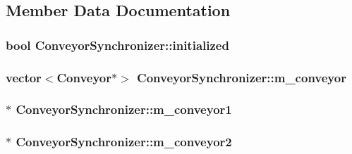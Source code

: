 \subsection{Member Data Documentation}
\hypertarget{classConveyorSynchronizer_aff3ac2926f3771d47d4954cc384e21f3}{
\subsubsection[{initialized}]{\setlength{\rightskip}{0pt plus 5cm}bool Conveyor\-Synchronizer\-::initialized}}\label{classConveyorSynchronizer_aff3ac2926f3771d47d4954cc384e21f3}
\hypertarget{classConveyorSynchronizer_a2df84a539b1399075936bafcb23a874d}{
\subsubsection[{m\-\_\-conveyor}]{\setlength{\rightskip}{0pt plus 5cm}vector$<${\bf Conveyor}$\ast$$>$ Conveyor\-Synchronizer\-::m\-\_\-conveyor}}\label{classConveyorSynchronizer_a2df84a539b1399075936bafcb23a874d}
\hypertarget{classConveyorSynchronizer_a0b3932b4b2eb980377a01913ac7e31f7}{
\subsubsection[{m\-\_\-conveyor1}]{$\ast$ Conveyor\-Synchronizer\-::m\-\_\-conveyor1}}\label{classConveyorSynchronizer_a0b3932b4b2eb980377a01913ac7e31f7}
\hypertarget{classConveyorSynchronizer_a6d409ca27bf95110c977946158da2fed}{
\subsubsection[{m\-\_\-conveyor2}]{$\ast$ Conveyor\-Synchronizer\-::m\-\_\-conveyor2}}\label{classConveyorSynchronizer_a6d409ca27bf95110c977946158da2fed}
